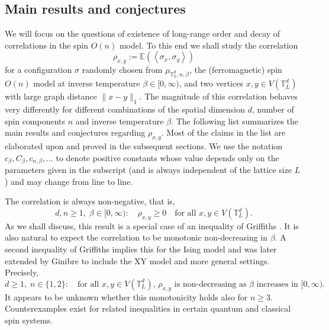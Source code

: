 \documentclass[12pt,reqno]{article}
\def\E{\mathbb{E}}
\def\T{\mathbb{T}}
\begin{document}
\subsection{Main results and conjectures}\label{sec:spin_O_n_results_and_conjectures}
We will focus on the questions of existence of long-range order and decay of correlations in the spin $O(n)$ model. To this end we shall study the correlation
\begin{equation*}
  \rho_{x,y}:=\E(\left\langle\sigma_x,\sigma_y\right\rangle)
\end{equation*}
for a configuration $\sigma$ randomly chosen from
$\mu_{\T_L^d,n,\beta}$, the (ferromagnetic) spin $O(n)$ model at
inverse temperature $\beta\in[0,\infty)$, and two vertices $x,y\in
V(\T_L^d)$ with large graph distance $\|x-y\|_1$. The magnitude of
this correlation behaves very differently for different combinations
of the spatial dimension $d$, number of spin components $n$ and
inverse temperature $\beta$. The following list summarizes the main
results and conjectures regarding $\rho_{x,y}$. Most of the claims
in the list are elaborated upon and proved in the subsequent
sections. We use the notation $c_{\beta}, C_{\beta}, c_{n,\beta},
\ldots$ to denote positive constants whose value depends only on the
parameters given in the subscript (and is always independent of the
lattice size $L$) and may change from line to line.

\medbreak {} The
correlation is always non-negative, that is,
\begin{equation*}
  d,n\ge 1,\; \beta\in [0,\infty)\colon\quad \rho_{x,y} \ge 0\quad\text{for all $x,y\in V(\T_L^d)$}.
\end{equation*}
As we shall discuss, this result is a special case of an inequality
of Griffiths \cite{Gri67}. It is also natural to expect
the correlation to be monotonic non-decreasing in $\beta$. A second
inequality of Griffiths \cite{Gri67} implies this for the Ising model and was
later extended by Ginibre \cite{Gin70} to include the XY model and more general
settings. Precisely,
\begin{equation*}
  d\ge 1,\; n\in\{1,2\}\colon\quad \text{for all $x,y\in V(\T_L^d)$, $\rho_{x,y}$ is
  non-decreasing as $\beta$ increases in $[0,\infty)$}.
\end{equation*}
It appears to be unknown whether this monotonicity holds also for
$n\ge 3$. Counterexamples exist for related inequalities in
certain quantum \cite{hurst1969griffiths} and classical \cite{Syl80} spin systems.
\end{document}
